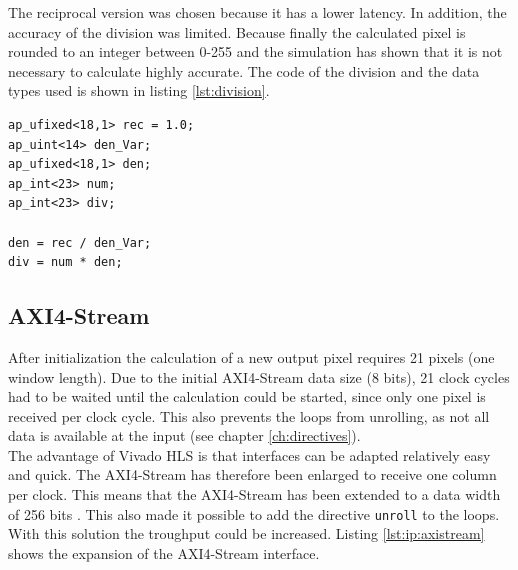 The reciprocal version was chosen because it has a lower latency. In addition,
the accuracy of the division was limited. Because finally the calculated pixel
is rounded to an integer between 0-255 and the simulation has shown that it is
not necessary to calculate highly accurate. The code of the division and the
data types used is shown in listing \ref{lst:division}.

\begin{minipage}{\textwidth}
\begin{lstlisting}[style=CStyle, caption=Calculation of the division for the Wallis filter, label=lst:division]
ap_ufixed<18,1> rec = 1.0;
ap_uint<14> den_Var;
ap_ufixed<18,1> den;
ap_int<23> num;
ap_int<23> div;

den = rec / den_Var;
div = num * den;
\end{lstlisting}
\end{minipage}


\subsection{AXI4-Stream} \label{ch:ip:axi}
After initialization the calculation of a new output pixel
requires 21 pixels (one window length). Due to the initial AXI4-Stream data size
(8 bits), 21 clock cycles had to be waited until the calculation could be
started, since only one pixel is received per clock cycle. This also prevents
the loops from unrolling, as not all data is available at the input (see chapter \ref{ch:directives}). \\
The advantage of Vivado HLS is that interfaces can be adapted relatively easy
and quick. The AXI4-Stream has therefore been enlarged to receive one column per
clock. This means that the AXI4-Stream has been extended to a data width of 256
bits \cite{axi_stream}. This also made it possible to add the directive 
\texttt{unroll} to the loops. With this solution the troughput could be
increased. Listing \ref{lst:ip:axistream} shows the expansion of the AXI4-Stream interface.


